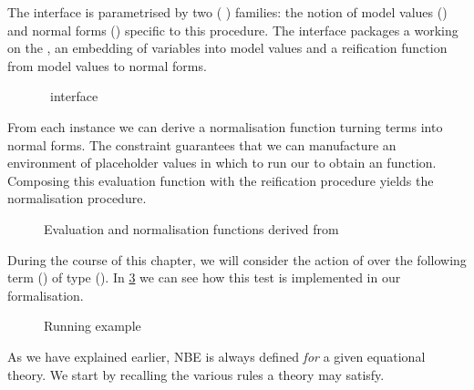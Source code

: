 The  interface is parametrised by two ( )
families: the notion of model values () and normal forms
() specific to this procedure. The interface packages a 
working on the , an embedding of variables into model values
and a reification function from model values to normal forms.

\begin{figure}[h]
\caption{~interface}\label{fig:nbeinterface}
\end{figure}

From each  instance we can derive a normalisation function turning
terms into normal forms. The  constraint guarantees that we can
manufacture an environment of placeholder values in which to run our
 to obtain an  function. Composing this evaluation
function with the reification procedure yields the normalisation procedure.

\begin{figure}[h]
\begin{minipage}[t]{0.55\textwidth}
\end{minipage}\begin{minipage}[t]{0.35\textwidth}
\end{minipage}
\caption{Evaluation and normalisation functions derived from }\label{fig:nbecorrolaries}
\end{figure}

During the course of this chapter, we will consider the action of 
over the following term ()
of type (\arrow{\bool}{\arrow{\unit}{\unit}}).
%
In \cref{fig:nbetest} we can see how this test is implemented in our formalisation.

\begin{figure}[h]
\caption{Running example}\label{fig:nbetest}
\end{figure}

As we have explained earlier, NBE is always defined \emph{for} a given
equational theory. We start by recalling the various rules a theory may
satisfy.

